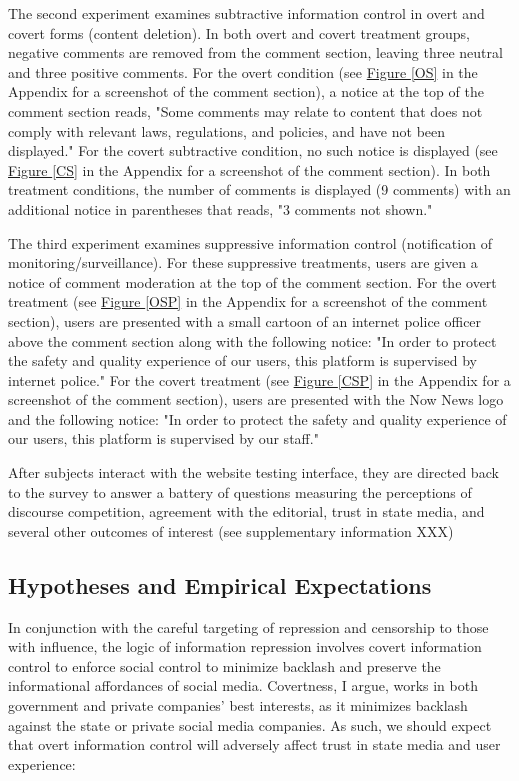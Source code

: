\documentclass[11pt]{article}
\begin{document}
The second experiment examines subtractive information control in overt and covert forms (content deletion). In both overt and covert treatment groups, negative comments are removed from the comment section, leaving three neutral and three positive comments. For the overt condition (see \hyperref[OS]{Figure \ref*{OS}} in the Appendix for a screenshot of the comment section), a notice at the top of the comment section reads, "Some comments may relate to content that does not comply with relevant laws, regulations, and policies, and have not been displayed." For the covert subtractive condition, no such notice is displayed (see \hyperref[CS]{Figure \ref*{CS}} in the Appendix for a screenshot of the comment section). In both treatment conditions, the number of comments is displayed (9 comments) with an additional notice in parentheses that reads, "3 comments not shown."

The third experiment examines suppressive information control (notification of monitoring/surveillance). For these suppressive treatments, users are given a notice of comment moderation at the top of the comment section. For the overt treatment (see \hyperref[OSP]{Figure \ref*{OSP}} in the Appendix for a screenshot of the comment section), users are presented with a small cartoon of an internet police officer above the comment section along with the following notice: "In order to protect the safety and quality experience of our users, this platform is supervised by internet police." For the covert treatment (see \hyperref[CSP]{Figure \ref*{CSP}} in the Appendix for a screenshot of the comment section), users are presented with the Now News logo and the following notice: "In order to protect the safety and quality experience of our users, this platform is supervised by our staff."

After subjects interact with the website testing interface, they are directed back to the survey to answer a battery of questions measuring the perceptions of discourse competition, agreement with the editorial, trust in state media, and several other outcomes of interest (see supplementary information XXX)

\subsection{Hypotheses and Empirical Expectations}

In conjunction with the careful targeting of repression and censorship to those with influence, the logic of information repression involves covert information control to enforce social control to minimize backlash and preserve the informational affordances of social media. Covertness, I argue, works in both government and private companies' best interests, as it minimizes backlash against the state or private social media companies. As such, we should expect that overt information control will adversely affect trust in state media and user experience:
\end{document}
